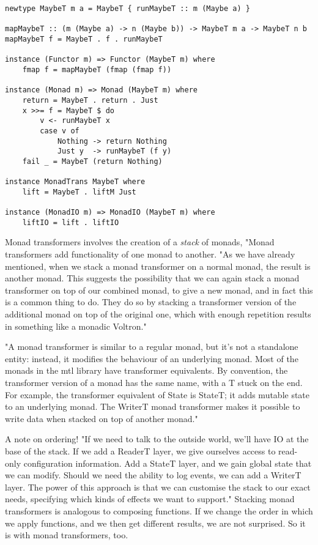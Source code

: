 \begin{verbatim}
newtype MaybeT m a = MaybeT { runMaybeT :: m (Maybe a) }

mapMaybeT :: (m (Maybe a) -> n (Maybe b)) -> MaybeT m a -> MaybeT n b
mapMaybeT f = MaybeT . f . runMaybeT

instance (Functor m) => Functor (MaybeT m) where
    fmap f = mapMaybeT (fmap (fmap f))

instance (Monad m) => Monad (MaybeT m) where
    return = MaybeT . return . Just
    x >>= f = MaybeT $ do
        v <- runMaybeT x
        case v of
            Nothing -> return Nothing
            Just y  -> runMaybeT (f y)
    fail _ = MaybeT (return Nothing)

instance MonadTrans MaybeT where
    lift = MaybeT . liftM Just

instance (MonadIO m) => MonadIO (MaybeT m) where
    liftIO = lift . liftIO
\end{verbatim}

Monad transformers involves
the creation of a \textit{stack} of monads,
"Monad transformers add functionality of one monad to another.
"As we have already mentioned, when we stack a monad transformer on a normal monad,
the result is another monad.
This suggests the possibility that we can again stack a monad transformer on top of our combined monad,
to give a new monad,
and in fact this is a common thing to do.
They do so by stacking a transformer version of the additional monad
on top of the original one, which with enough repetition results in something like a monadic Voltron."

"A monad transformer is similar to a regular monad,
but it's not a standalone entity: instead,
it modifies the behaviour of an underlying monad.
Most of the monads in the mtl library have transformer equivalents.
By convention, the transformer version of a monad has the same name,
with a T stuck on the end.
For example, the transformer equivalent of State is StateT;
it adds mutable state to an underlying monad.
The WriterT monad transformer makes it possible to write data when stacked on top of another monad."


A note on ordering!
"If we need to talk to the outside world, we'll have IO at the base of the stack.
If we add a ReaderT layer, we give ourselves access to read-only configuration information.
Add a StateT layer, and we gain global state that we can modify.
Should we need the ability to log events, we can add a WriterT layer.
The power of this approach is that we can customise the stack to our exact needs,
specifying which kinds of effects we want to support."
Stacking monad transformers is analogous to composing functions.
If we change the order in which we apply functions, and we then get different results, we are not surprised. So it is with monad transformers, too.

